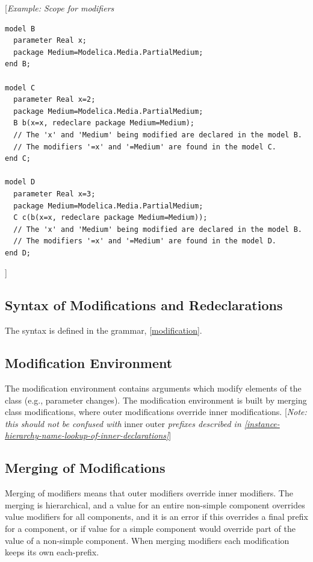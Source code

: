 \documentclass[10pt,a4paper]{report}
\def\doublelabel#1{\label{#1}}
\begin{document}
{[}\emph{Example: Scope for modifiers}
\begin{lstlisting}[language=modelica]
model B
  parameter Real x;
  package Medium=Modelica.Media.PartialMedium;
end B;

model C
  parameter Real x=2;
  package Medium=Modelica.Media.PartialMedium;
  B b(x=x, redeclare package Medium=Medium);
  // The 'x' and 'Medium' being modified are declared in the model B.
  // The modifiers '=x' and '=Medium' are found in the model C.
end C;

model D
  parameter Real x=3;
  package Medium=Modelica.Media.PartialMedium;
  C c(b(x=x, redeclare package Medium=Medium));
  // The 'x' and 'Medium' being modified are declared in the model B.
  // The modifiers '=x' and '=Medium' are found in the model D.
end D;
\end{lstlisting}

{]}

\subsection{Syntax of Modifications and Redeclarations}\doublelabel{syntax-of-modifications-and-redeclarations}

The syntax is defined in the grammar, \ref{modification}.

\subsection{Modification Environment}\doublelabel{modification-environment}

The modification environment contains arguments which modify elements of
the class (e.g., parameter changes). The modification environment is
built by merging class modifications, where outer modifications override
inner modifications. {[}\emph{Note: this should not be confused with}
inner outer \emph{prefixes described in \ref{instance-hierarchy-name-lookup-of-inner-declarations}}{]}

\subsection{Merging of Modifications}\doublelabel{merging-of-modifications}

Merging of modifiers means that outer modifiers override inner
modifiers. The merging is hierarchical, and a value for an entire
non-simple component overrides value modifiers for all components, and
it is an error if this overrides a final prefix for a component, or if
value for a simple component would override part of the value of a
non-simple component. When merging modifiers each modification keeps its
own each-prefix.
\end{document}
